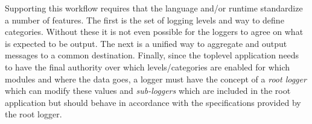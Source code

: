 Supporting this workflow requires that the language and/or runtime standardize 
a number of features. The first is the set of logging levels and way to define 
categories. Without these it is not even possible for the loggers to agree on 
what is expected to be output. The next is a unified way to aggregate and output 
messages to a common destination. Finally, since the toplevel application needs 
to have the final authority over which levels/categories are enabled for which 
modules and where the data goes, a logger must have the concept of a 
\emph{root logger} which can modify these values and \emph{sub-loggers} which 
are included in the root application but should behave in accordance with the 
specifications provided by the root logger.
